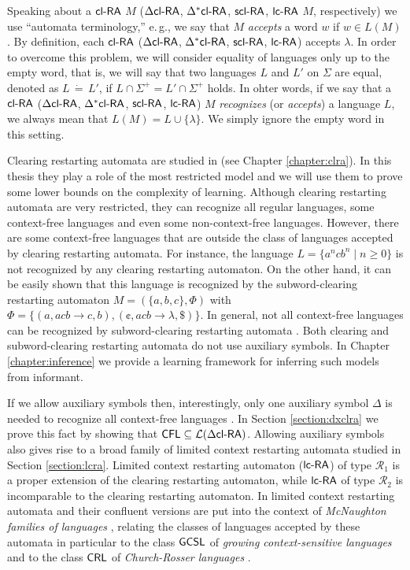 \begin{remark}\label{remark:lambda}
Speaking about a $\textup{\sf cl-RA\/}$ $M$ ($\textup{\sf $\Delta$cl-RA\/}$, $\textup{\sf $\Delta^*$cl-RA\/}$, $\textup{\sf scl-RA}$, $\lcRA$ $M$, respectively) we use ``automata terminology,'' e.\,g., we say that $M$ \emph{accepts} a word $w$ if $w \in L(M)$. By definition, each $\textup{\sf cl-RA\/}$ ($\textup{\sf $\Delta$cl-RA\/}$, $\textup{\sf $\Delta^*$cl-RA\/}$, $\textup{\sf scl-RA}$, $\lcRA$) accepts $\lambda$. In order to overcome this problem, we will consider equality of languages only up to the empty word, that is, we will say that two languages $L$ and $L'$ on $\Sigma$ are equal, denoted as $L\, \dot{=}\, L'$, if $L\cap \Sigma^+ = L'\cap\Sigma^+$ holds. In ohter words, if we say that a $\textup{\sf cl-RA\/}$ ($\textup{\sf $\Delta$cl-RA\/}$, $\textup{\sf $\Delta^*$cl-RA\/}$, $\textup{\sf scl-RA}$, $\lcRA$) $M$ \emph{recognizes} (or \emph{accepts}) a language $L$, we always mean that $L(M) = L \cup \{\lambda\}$. We simply ignore the empty word in this setting.
\end{remark}

Clearing restarting automata are studied in \citep{CM10} (see Chapter \ref{chapter:clra}). In this thesis they play a role of the most restricted model and we will use them to prove some lower bounds on the complexity of learning. Although clearing restarting automata are very restricted, they can recognize all regular languages, some context-free languages and even some non-context-free languages. However, there are some context-free languages that are outside the class of languages accepted by clearing restarting automata. For instance, the language $L = \{a^n c b^n \mid n \ge 0\}$ is not recognized by any clearing restarting automaton. On the other hand, it can be easily shown that this language is recognized by the subword-clearing restarting automaton $M = (\{a, b, c\}, \Phi)$ with $\Phi = \{(a, acb \to c, b), (\cent, acb \to \lambda, \$)\}$. In general, not all context-free languages can be recognized by subword-clearing restarting automata \citep{C13}. Both clearing and subword-clearing restarting automata do not use auxiliary symbols. In Chapter \ref{chapter:inference} we provide a learning framework for inferring such models from informant.

If we allow auxiliary symbols then, interestingly, only one auxiliary symbol $\Delta$ is needed to recognize all context-free languages \citep{CM11}. In Section \ref{section:dxclra} we prove this fact by showing that $\textup{\sf CFL} \subseteq {\cal L}(\textup{\sf $\Delta$cl-RA\/})$. Allowing auxiliary symbols also gives rise to a broad family of limited context restarting automata studied in Section \ref{section:lcra}. Limited context restarting automaton ($\lcRA$) of type $\mathcal{R}_1$ is a proper extension of the clearing restarting automaton, while $\lcRA$ of type $\mathcal{R}_2$ is incomparable to the clearing restarting automaton. In \citep{OCM13} limited context restarting automata and their confluent versions are put into the context of \emph{McNaughton families of languages} \citep{Beaudry2003}, relating the classes of languages accepted by these automata in particular to the class $\textup{\sf GCSL}$ of \emph{growing context-sensitive languages} \citep{Buntrock19981,Dahlhaus1986} and to the class $\textup{\sf CRL}$ of \emph{Church-Rosser languages} \citep{MNO88}.

